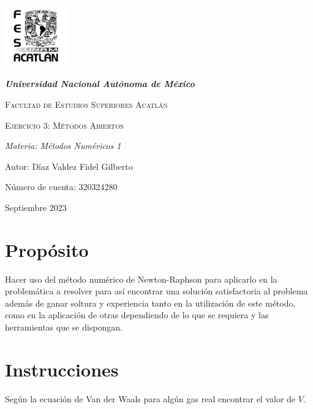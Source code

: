 \documentclass{article}
\begin{document}
   \begin{titlepage}
       \centering
       {\includegraphics[width=0.2\textwidth]{logo.png} \par}
       {\bfseries\LARGE\textit{Universidad Nacional Autónoma de México}\par}
       \vspace{1cm}


       {\scshape\Large Facultad de Estudios Superiores Acatlán \par}
       \vspace{3cm}


       {\scshape\Huge Ejercicio 3: Métodos Abiertos}
       \vspace{3cm}


       {\slshape\Large Materia: Métodos Numéricos 1 \par}
       \vfill


       {\Large Autor: Díaz Valdez Fidel Gilberto \par}
       {\Large Número de cuenta: 320324280 \par}


       \vfill
       {\Large Septiembre 2023 \par}


   \end{titlepage}


\section{Propósito}
Hacer uso del método numérico de Newton-Raphson para aplicarlo en la problemática a resolver para así encontrar una solución satisfactoria al problema además de ganar soltura y experiencia tanto en la utilización de este método, como en la aplicación de otras dependiendo de lo que se requiera y las herramientas que se dispongan.


\section{Instrucciones}
Según la ecuación de Van der Waals para algún gas real encontrar el valor de $V$.
\end{document}
